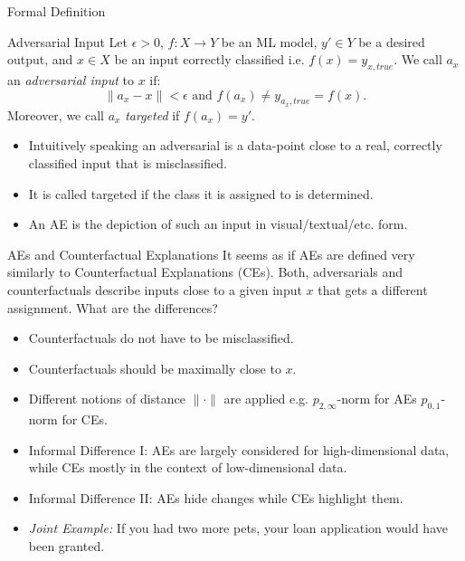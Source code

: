 \documentclass[11pt,compress,t,notes=noshow, xcolor=table]{beamer}
\begin{document}
\begin{vbframe}{Formal Definition}
\begin{block}{Adversarial Input}
Let $\epsilon>0$, $f:X\rightarrow Y$ be an ML model, $y'\in Y$ be a desired output, and $x\in X$ be an input correctly classified i.e. $f(x)=y_{x,true}$. We call $a_x$ an \emph{adversarial input} to $x$ if:
\begin{equation*}
    \| a_{x}- x\|<\epsilon\text{ and } f(a_{x})\neq y_{a_x,true}=f(x).
\end{equation*}
Moreover, we call $a_x$ \emph{targeted} if $f(a_{x})=y'$.
\end{block}
\begin{itemize}
    \item Intuitively speaking an adversarial is a data-point close to a real, correctly classified input that is misclassified.
    \item It is called targeted if the class it is assigned to is determined.
    \item An AE is the depiction of such an input in visual/textual/etc. form. 
\end{itemize}
\end{vbframe}


\begin{vbframe}{AEs and Counterfactual Explanations}
It seems as if AEs are defined very similarly to Counterfactual Explanations (CEs). Both, adversarials and counterfactuals describe inputs close to a given input $x$ that gets a different assignment. What are the differences?
\begin{itemize}
    \item Counterfactuals do not have to be misclassified.
    \item Counterfactuals should be maximally close to $x$.
    \item Different notions of distance $\|\cdot\|$ are applied e.g. $p_{2,\infty}$-norm for AEs $p_{0,1}$-norm for CEs.
    \item Informal Difference I: AEs are largely considered for high-dimensional data, while CEs mostly in the context of low-dimensional data.
    \item Informal Difference II: AEs hide changes while CEs highlight them.
    \item \emph{Joint Example:} If you had two more pets, your loan application would have been granted.
\end{itemize}
\end{vbframe}
\end{document}
